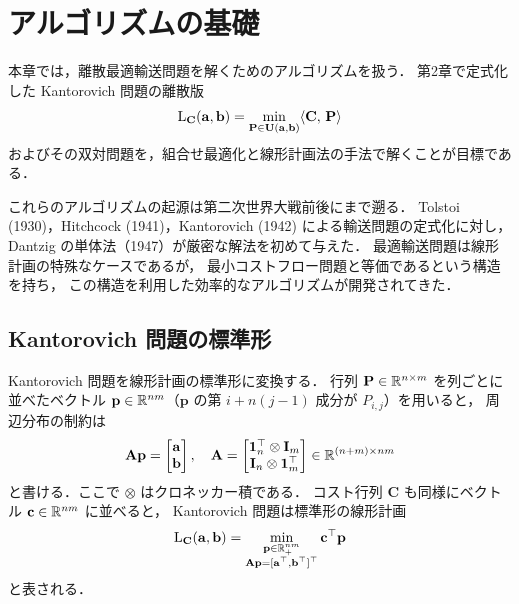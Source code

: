 \chapter{アルゴリズムの基礎}
\label{ch:algorithmic-foundations}

本章では，離散最適輸送問題を解くためのアルゴリズムを扱う．
第2章で定式化した Kantorovich 問題の離散版
\[
  \mathrm{L}_{\mathbf{C}}(\mathbf{a}, \mathbf{b})
  = \min_{\mathbf{P} \in \mathbf{U}(\mathbf{a}, \mathbf{b})}
  \langle \mathbf{C},\, \mathbf{P} \rangle
\]
およびその双対問題を，組合せ最適化と線形計画法の手法で解くことが目標である．

これらのアルゴリズムの起源は第二次世界大戦前後にまで遡る．
Tolstoi (1930)，Hitchcock (1941)，Kantorovich (1942) による輸送問題の定式化に対し，
Dantzig の単体法（1947）が厳密な解法を初めて与えた．
最適輸送問題は線形計画の特殊なケースであるが，
最小コストフロー問題と等価であるという構造を持ち，
この構造を利用した効率的なアルゴリズムが開発されてきた．

\section{Kantorovich 問題の標準形}
\label{sec:standard-form}

Kantorovich 問題を線形計画の標準形に変換する．
行列 $\mathbf{P} \in \mathbb{R}^{n \times m}$ を列ごとに並べたベクトル
$\mathbf{p} \in \mathbb{R}^{nm}$（$\mathbf{p}$ の第 $i + n(j-1)$ 成分が $P_{i,j}$）を用いると，
周辺分布の制約は
\[
  \mathbf{A} \mathbf{p}
  = \begin{bmatrix} \mathbf{a} \\ \mathbf{b} \end{bmatrix},
  \quad
  \mathbf{A} =
  \begin{bmatrix}
    \mathbf{1}_n^\top \otimes \mathbf{I}_m \\
    \mathbf{I}_n \otimes \mathbf{1}_m^\top
  \end{bmatrix}
  \in \mathbb{R}^{(n+m) \times nm}
\]
と書ける．ここで $\otimes$ はクロネッカー積である．
コスト行列 $\mathbf{C}$ も同様にベクトル $\mathbf{c} \in \mathbb{R}^{nm}$ に並べると，
Kantorovich 問題は標準形の線形計画
\[
  \mathrm{L}_{\mathbf{C}}(\mathbf{a}, \mathbf{b})
  = \min_{\substack{\mathbf{p} \in \mathbb{R}_+^{nm} \\
  \mathbf{A}\mathbf{p} = [\mathbf{a}^\top, \mathbf{b}^\top]^\top}}
  \mathbf{c}^\top \mathbf{p}
\]
と表される．

